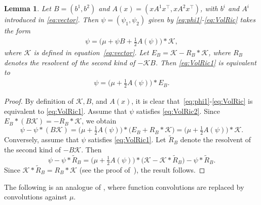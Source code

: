 \documentclass[10pt,a4paper,reqno]{amsart}
\theoremstyle{plain}
\newtheorem{lemma}[theorem]{Lemma}
\theoremstyle{definition}
\theoremstyle{remark}
\theoremstyle{example}
\begin{document}
\begin{lemma}\label{lem:VolRicequiv}
Let $B = (b^1,b^2)$ and $A(x) = (xA^1x^\top, xA^2x^\top)$, with $b^i$ and $A^i$ introduced in \eqref{eq:vector}. Then $\psi = (\psi_1, \psi_2)$ given by \eqref{eq:phi1}-\eqref{eq:VolRic} takes the form 
\begin{align}\label{eq:VolRic1}
    \psi = \bigl(\mu + \psi B + \tfrac{1}{2}A(\psi)\bigr)\ast \bm{\mathcal{K}},
\end{align}
where $\bm{\mathcal{K}}$ is defined in equation~\eqref{eq:vector}. Let $E_B = \bm{\mathcal{K}} - R_B\ast \bm{\mathcal{K}}$, where $R_B$ denotes the resolvent of the second kind of $-\bm{\mathcal{K}}B$. Then \eqref{eq:VolRic1} is equivalent to 
\begin{align}\label{eq:VolRic2}
    \psi = \bigl(\mu + \tfrac{1}{2}A(\psi)\bigr)\ast E_B.
\end{align}
\end{lemma}
\begin{proof}
    By definition of $\bm{\mathcal{K}}, B$, and $A(x)$, it is clear that~\eqref{eq:phi1}-\eqref{eq:VolRic} is equivalent to \eqref{eq:VolRic1}. Assume that $\psi$ satisfies \eqref{eq:VolRic2}. Since $E_B\ast(B\bm{\mathcal{K}}) = -R_B\ast\bm{\mathcal{K}}$, we obtain
    $$
        \psi - \psi\ast(B\bm{\mathcal{K}}) 
        = \bigl(\mu + \tfrac{1}{2}A(\psi)\bigr)\ast \bigl(E_B + R_B\ast\bm{\mathcal{K}}\bigr) = \bigl(\mu + \tfrac{1}{2}A(\psi)\bigr)\ast \bm{\mathcal{K}}.
    $$
    Conversely, assume that $\psi$ satisfies \eqref{eq:VolRic1}. Let $\widetilde{R}_B$ denote the resolvent of the second kind of $-B\bm{\mathcal{K}}$. Then
$$
    \psi - \psi\ast \widetilde{R}_B 
    = \bigl(\mu + \tfrac{1}{2}A(\psi)\bigr)\ast 
      \bigl(\bm{\mathcal{K}} - \bm{\mathcal{K}}\ast \widetilde{R}_B\bigr) - \psi\ast \widetilde{R}_B.
$$
Since $\bm{\mathcal{K}}\ast \widetilde{R}_B = R_B\ast \bm{\mathcal{K}}$ 
(see the proof of~\cite[Lem.~4.4]{abi2019affine}), the result follows.
\end{proof}

The following is an analogue of \cite[Thm. 4.3]{abi2019affine}, where function convolutions are replaced by convolutions against $\mu$.
  
\end{document}
